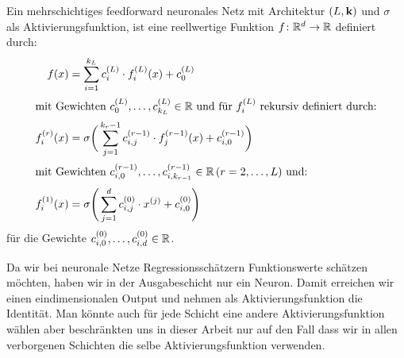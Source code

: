 \begin{defn}
\label{def:nn}
Ein mehrschichtiges feedforward neuronales Netz mit Architektur $(L, \mathbf{k})$ und $\sigma$ als Aktivierungsfunktion, ist eine reellwertige Funktion $f\colon \mathbb{R}^d \to \mathbb{R}$ definiert durch:
\begin{align}
\label{networkarch}
f(x) & = \sum_{i = 1}^{k_L} c_i^{(L)} \cdot f_i^{(L)}(x) + c_0^{(L)} \nonumber \\
\intertext{mit Gewichten $c_0^{(L)},\dots,c_{k_L}^{(L)} \in \mathbb{R}$ und für $f_i^{(L)}$ rekursiv definiert durch:} 
f_i^{(r)}(x) & = \sigma \bigg(\sum_{j = 1}^{k_r - 1} c_{i,j}^{(r - 1)} \cdot f_j^{(r - 1)}(x) + c_{i,0}^{(r - 1)} \bigg)\\
\intertext{mit Gewichten $c_{i,0}^{(r - 1)},\dots,c_{i,k_{r - 1}}^{(r - 1)} \in \mathbb{R} \,(r = 2,\dots, L)$ und:}
f_i^{(1)}(x) & = \sigma \Bigg(\sum_{j = 1}^{d} c_{i,j}^{(0)} \cdot x^{(j)} + c_{i,0}^{(0)} \Bigg) \nonumber
\end{align} 
für die Gewichte $c_{i,0}^{(0)},\dots,c_{i,d}^{(0)} \in \mathbb{R}$.
\end{defn}
Da wir bei neuronale Netze Regressionsschätzern Funktionswerte schätzen möchten, haben wir in der Ausgabeschicht nur ein Neuron. Damit erreichen wir einen eindimensionalen Output und nehmen als Aktivierungsfunktion die Identität.
Man könnte auch für jede Schicht eine andere Aktivierungsfunktion wählen aber beschränkten uns in dieser Arbeit nur auf den Fall dass wir in allen verborgenen Schichten die selbe Aktivierungsfunktion verwenden.

